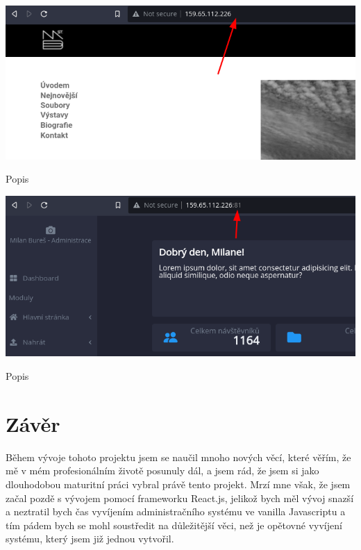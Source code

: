 \documentclass[12pt,a4paper]{report}
\begin{document}
  \vspace*{0.5cm}
  \noindent\includegraphics[width=\linewidth]{VPS_WEB.png}
  \begin{center}
    Popis
  \end{center}
  \vspace*{0.5cm}
  \vspace*{0.5cm}
  \noindent\includegraphics[width=\linewidth]{VPS_CMS.png}
  \begin{center}
    Popis
  \end{center}
  \vspace*{0.5cm}


  \chapter{Závěr}
  Během vývoje tohoto projektu jsem se naučil mnoho nových věcí, které věřím, že mě v mém
  profesionálním životě posunuly dál, a jsem rád, že jsem si jako dlouhodobou maturitní práci
  vybral právě tento projekt. Mrzí mne však, že jsem začal pozdě s vývojem pomocí frameworku
  React.js, jelikož bych měl vývoj snazší a neztratil bych čas vyvíjením administračního systému ve
  vanilla Javascriptu a tím pádem bych se mohl soustředit na důležitější věci, než je opětovné
  vyvíjení systému, který jsem již jednou vytvořil.
 
\end{document}
